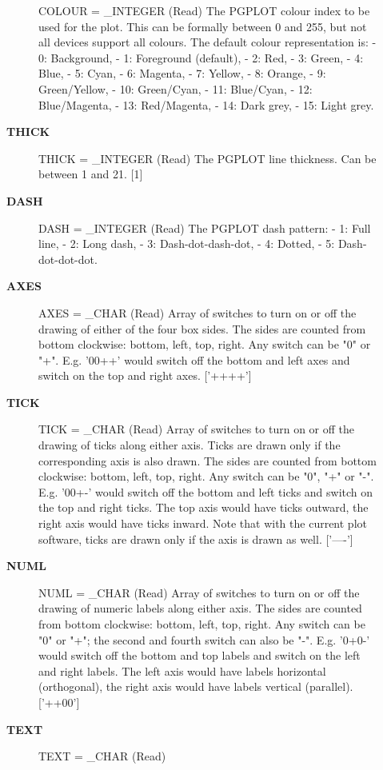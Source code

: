 \begin{description}
\begin{description}
COLOUR = \_INTEGER (Read)
   The PGPLOT colour index to be used for the plot. This can be
   formally between 0 and 255, but not all devices support all
   colours. The default colour representation is:
   -  0: Background,         -  1: Foreground (default),
   -  2: Red,                -  3: Green,
   -  4: Blue,               -  5: Cyan,
   -  6: Magenta,            -  7: Yellow,
   -  8: Orange,             -  9: Green/Yellow,
   -  10: Green/Cyan,        -  11: Blue/Cyan,
   -  12: Blue/Magenta,      -  13: Red/Magenta,
   -  14: Dark grey,         -  15: Light grey.
\item [\textbf{THICK}]
THICK = \_INTEGER (Read)
   The PGPLOT line thickness. Can be between 1 and 21. [1]
\item [\textbf{DASH}]
DASH = \_INTEGER (Read)
   The PGPLOT dash pattern:
   -  1: Full line,
   -  2: Long dash,
   -  3: Dash-dot-dash-dot,
   -  4: Dotted,
   -  5: Dash-dot-dot-dot.
\item [\textbf{AXES}]
AXES = \_CHAR (Read)
   Array of switches to turn on or off the drawing of either of
   the four box sides. The sides are counted from bottom
   clockwise: bottom, left, top, right. Any switch can be
   "0" or "+". E.g. '00++' would switch off the bottom and left
   axes and switch on the top and right axes. ['++++']
\item [\textbf{TICK}]
TICK = \_CHAR (Read)
   Array of switches to turn on or off the drawing of ticks along
   either axis. Ticks are drawn only if the corresponding axis is
   also drawn. The sides are counted from bottom
   clockwise: bottom, left, top, right. Any switch can be
   "0", "+" or "-". E.g. '00+-' would switch off the bottom and
   left ticks and switch on the top and right ticks. The top axis
   would have ticks outward, the right axis would have ticks
   inward.
   Note that with the current plot software, ticks are drawn only
   if the axis is drawn as well. ['----']
\item [\textbf{NUML}]
NUML = \_CHAR (Read)
   Array of switches to turn on or off the drawing of numeric
   labels along either axis. The sides are counted from bottom
   clockwise: bottom, left, top, right. Any switch can be
   "0" or "+"; the second and fourth switch can also be "-". E.g.
   '0+0-' would switch off the bottom and top labels and switch
   on the left and right labels. The left axis would have labels
   horizontal (orthogonal), the right axis would have labels
   vertical (parallel). ['++00']
\item [\textbf{TEXT}]
TEXT = \_CHAR (Read)

\end{description}
\end{description}
